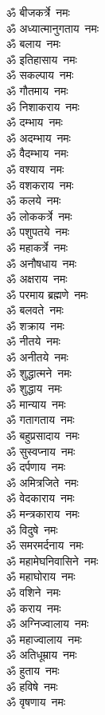 \begin{multicols}{2}
\begin{flushleft}
ॐ बीजकर्त्रे~नमः\\
ॐ अध्यात्मानुगताय~नमः\\
ॐ बलाय~नमः\\
ॐ इतिहासाय~नमः\\
ॐ सकल्पाय~नमः\\
ॐ गौतमाय~नमः\hfill{}\\
ॐ निशाकराय~नमः\\
ॐ दम्भाय~नमः\\
ॐ अदम्भाय~नमः\\
ॐ वैदम्भाय~नमः\\
ॐ वश्याय~नमः\\
ॐ वशकराय~नमः\\
ॐ कलये~नमः\\
ॐ लोककर्त्रे~नमः\\
ॐ पशुपतये~नमः\\
ॐ महाकर्त्रे~नमः\hfill{}\\
ॐ अनौषधाय~नमः\\
ॐ अक्षराय~नमः\\
ॐ परमाय ब्रह्मणे~नमः\\
ॐ बलवते~नमः\\
ॐ शक्राय~नमः\\
ॐ नीतये~नमः\\
ॐ अनीतये~नमः\\
ॐ शुद्धात्मने~नमः\\
ॐ शुद्धाय~नमः\\
ॐ मान्याय~नमः\hfill{}\\
ॐ गतागताय~नमः\\
ॐ बहुप्रसादाय~नमः\\
ॐ सुस्वप्नाय~नमः\\
ॐ दर्पणाय~नमः\\
ॐ अमित्रजिते~नमः\\
ॐ वेदकाराय~नमः\\
ॐ मन्त्रकाराय~नमः\\
ॐ विदुषे~नमः\\
ॐ समरमर्दनाय~नमः\\
ॐ महामेघनिवासिने~नमः\hfill{}\\
ॐ महाघोराय~नमः\\
ॐ वशिने~नमः\\
ॐ कराय~नमः\\
ॐ अग्निज्वालाय~नमः\\
ॐ महाज्वालाय~नमः\\
ॐ अतिधूम्राय~नमः\\
ॐ हुताय~नमः\\
ॐ हविषे~नमः\\
ॐ वृषणाय~नमः\\

\end{flushleft}
\end{multicols}

